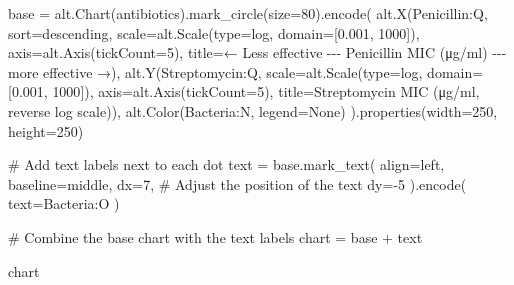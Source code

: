 \documentclass[
  letterpaper,
  DIV=11,
  numbers=noendperiod]{scrartcl}
\newenvironment{Shaded}{\begin{snugshade}}{\end{snugshade}}
\newcommand{\BuiltInTok}[1]{\textcolor[rgb]{0.00,0.23,0.31}{#1}}
\newcommand{\CommentTok}[1]{\textcolor[rgb]{0.37,0.37,0.37}{#1}}
\newcommand{\DecValTok}[1]{\textcolor[rgb]{0.68,0.00,0.00}{#1}}
\newcommand{\FloatTok}[1]{\textcolor[rgb]{0.68,0.00,0.00}{#1}}
\newcommand{\NormalTok}[1]{\textcolor[rgb]{0.00,0.23,0.31}{#1}}
\newcommand{\OperatorTok}[1]{\textcolor[rgb]{0.37,0.37,0.37}{#1}}
\newcommand{\StringTok}[1]{\textcolor[rgb]{0.13,0.47,0.30}{#1}}
\newcommand{\VariableTok}[1]{\textcolor[rgb]{0.07,0.07,0.07}{#1}}
\begin{document}
\begin{Shaded}
\begin{Highlighting}[]
\NormalTok{base }\OperatorTok{=}\NormalTok{ alt.Chart(antibiotics).mark\_circle(size}\OperatorTok{=}\DecValTok{80}\NormalTok{).encode(}
\NormalTok{    alt.X(}\StringTok{\textquotesingle{}Penicillin:Q\textquotesingle{}}\NormalTok{,}
\NormalTok{          sort}\OperatorTok{=}\StringTok{\textquotesingle{}descending\textquotesingle{}}\NormalTok{,}
\NormalTok{          scale}\OperatorTok{=}\NormalTok{alt.Scale(}\BuiltInTok{type}\OperatorTok{=}\StringTok{\textquotesingle{}log\textquotesingle{}}\NormalTok{, domain}\OperatorTok{=}\NormalTok{[}\FloatTok{0.001}\NormalTok{, }\DecValTok{1000}\NormalTok{]),}
\NormalTok{          axis}\OperatorTok{=}\NormalTok{alt.Axis(tickCount}\OperatorTok{=}\DecValTok{5}\NormalTok{),}
\NormalTok{          title}\OperatorTok{=}\StringTok{\textquotesingle{}← Less effective {-}{-}{-} Penicillin MIC (μg/ml) {-}{-}{-} more effective →\textquotesingle{}}\NormalTok{),}
\NormalTok{    alt.Y(}\StringTok{\textquotesingle{}Streptomycin:Q\textquotesingle{}}\NormalTok{,}
\NormalTok{          scale}\OperatorTok{=}\NormalTok{alt.Scale(}\BuiltInTok{type}\OperatorTok{=}\StringTok{\textquotesingle{}log\textquotesingle{}}\NormalTok{, domain}\OperatorTok{=}\NormalTok{[}\FloatTok{0.001}\NormalTok{, }\DecValTok{1000}\NormalTok{]),}
\NormalTok{          axis}\OperatorTok{=}\NormalTok{alt.Axis(tickCount}\OperatorTok{=}\DecValTok{5}\NormalTok{),}
\NormalTok{          title}\OperatorTok{=}\StringTok{\textquotesingle{}Streptomycin MIC (μg/ml, reverse log scale)\textquotesingle{}}\NormalTok{),}
\NormalTok{    alt.Color(}\StringTok{\textquotesingle{}Bacteria:N\textquotesingle{}}\NormalTok{, legend}\OperatorTok{=}\VariableTok{None}\NormalTok{)}
\NormalTok{).properties(width}\OperatorTok{=}\DecValTok{250}\NormalTok{, height}\OperatorTok{=}\DecValTok{250}\NormalTok{)}

\CommentTok{\# Add text labels next to each dot}
\NormalTok{text }\OperatorTok{=}\NormalTok{ base.mark\_text(}
\NormalTok{    align}\OperatorTok{=}\StringTok{\textquotesingle{}left\textquotesingle{}}\NormalTok{,}
\NormalTok{    baseline}\OperatorTok{=}\StringTok{\textquotesingle{}middle\textquotesingle{}}\NormalTok{,}
\NormalTok{    dx}\OperatorTok{=}\DecValTok{7}\NormalTok{,  }\CommentTok{\# Adjust the position of the text}
\NormalTok{    dy}\OperatorTok{={-}}\DecValTok{5}
\NormalTok{).encode(}
\NormalTok{    text}\OperatorTok{=}\StringTok{\textquotesingle{}Bacteria:O\textquotesingle{}}
\NormalTok{)}

\CommentTok{\# Combine the base chart with the text labels}
\NormalTok{chart }\OperatorTok{=}\NormalTok{ base }\OperatorTok{+}\NormalTok{ text}

\NormalTok{chart}
\end{Highlighting}
\end{Shaded}
\end{document}
